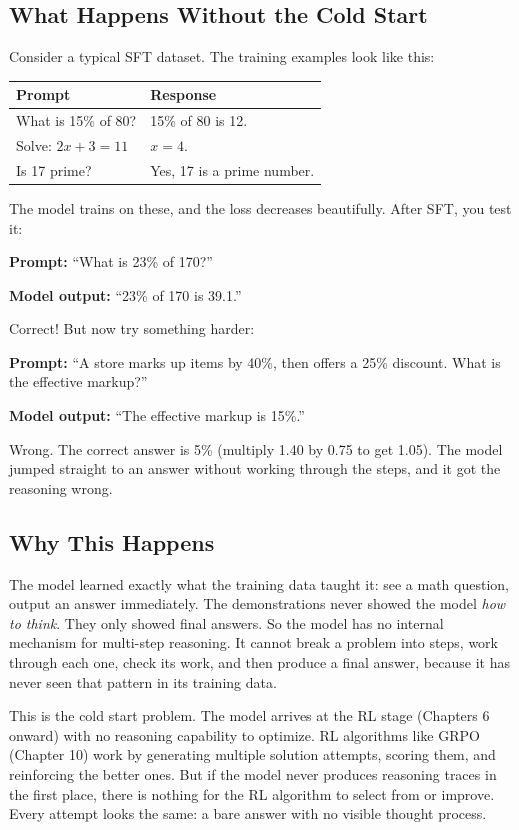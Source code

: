 \begin{chapterenv}
\subsection{What Happens Without the Cold Start}

Consider a typical SFT dataset. The training examples look like this:

\begin{center}
\begin{tabular}{p{}p{}}
\toprule
\textbf{Prompt} & \textbf{Response} \\
\midrule
What is 15\% of 80? & 15\% of 80 is 12. \\
Solve: $2x + 3 = 11$ & $x = 4$. \\
Is 17 prime? & Yes, 17 is a prime number. \\
\bottomrule
\end{tabular}
\end{center}

The model trains on these, and the loss decreases beautifully. After SFT, you test it:

\textbf{Prompt:} ``What is 23\% of 170?''

\textbf{Model output:} ``23\% of 170 is 39.1.''

Correct! But now try something harder:

\textbf{Prompt:} ``A store marks up items by 40\%, then offers a 25\% discount. What is the effective markup?''

\textbf{Model output:} ``The effective markup is 15\%.''

Wrong. The correct answer is 5\% (multiply 1.40 by 0.75 to get 1.05). The model jumped straight to an answer without working through the steps, and it got the reasoning wrong.

\subsection{Why This Happens}

The model learned exactly what the training data taught it: see a math question, output an answer immediately. The demonstrations never showed the model \textit{how to think}. They only showed final answers. So the model has no internal mechanism for multi-step reasoning. It cannot break a problem into steps, work through each one, check its work, and then produce a final answer, because it has never seen that pattern in its training data.

This is the cold start problem. The model arrives at the RL stage (Chapters 6 onward) with no reasoning capability to optimize. RL algorithms like GRPO (Chapter 10) work by generating multiple solution attempts, scoring them, and reinforcing the better ones. But if the model never produces reasoning traces in the first place, there is nothing for the RL algorithm to select from or improve. Every attempt looks the same: a bare answer with no visible thought process.


\end{chapterenv}
